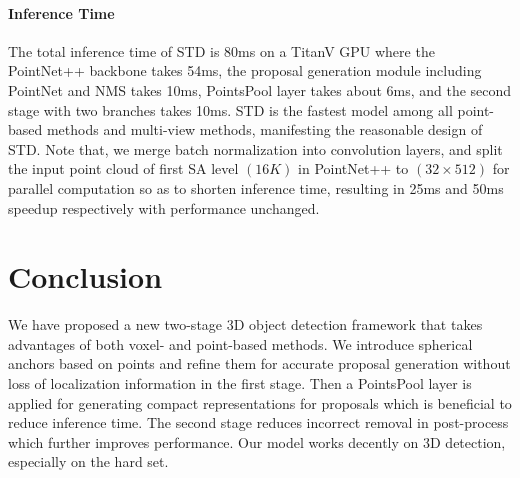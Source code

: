 \documentclass[10pt,twocolumn,letterpaper]{article}
\begin{document}
\vspace{-0.1in}
\paragraph{Inference Time}
The total inference time of STD is 80ms on a TitanV GPU where the PointNet++ backbone takes 54ms, the proposal generation module including PointNet and NMS takes 10ms, PointsPool layer takes about 6ms, and the second stage with two branches takes 10ms. STD is the fastest model among all point-based methods and multi-view methods, manifesting the reasonable design of STD. Note that, we merge batch normalization into convolution layers, and split the input point cloud of first SA level $(16K)$ in PointNet++ to $(32 \times 512)$ for parallel computation so as to shorten inference time, resulting in 25ms and 50ms speedup respectively with performance unchanged.


\section{Conclusion}
We have proposed a new two-stage 3D object detection framework that takes advantages of both voxel- and point-based methods. We introduce spherical anchors based on points and refine them for accurate proposal generation without loss of localization information in the first stage. Then a PointsPool layer is applied for generating compact representations for proposals which is beneficial to reduce inference time. The second stage reduces incorrect removal in post-process which further improves performance. Our model works decently on 3D detection, especially on the hard set. 



{\small


}
\end{document}
